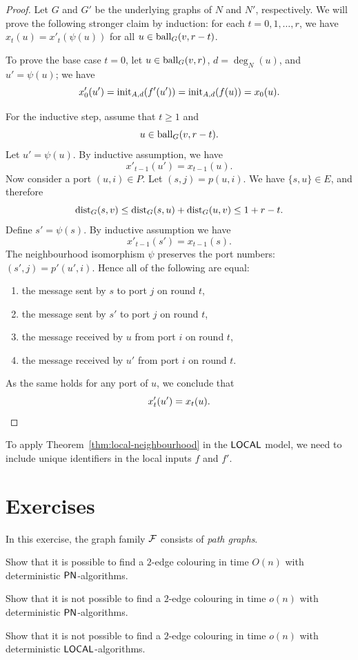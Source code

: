 \begin{proof}
    Let $G$ and $G'$ be the underlying graphs of $N$ and $N'$, respectively. We will prove the following stronger claim by induction: for each $t = 0, 1, \dotsc, r$, we have $x_t(u) = x'_t(\psi(u))$ for all $u \in \operatorname{ball}_G(v,r-t)$.
    
    To prove the base case $t = 0$, let $u \in \operatorname{ball}_G(v,r)$, $d = \deg_N(u)$, and $u' = \psi(u)$; we have
    \[
        x'_0(u') = \operatorname{init}_{A,d}(f'(u')) = \operatorname{init}_{A,d}(f(u)) = x_0(u).
    \]
    
    For the inductive step, assume that $t \ge 1$ and \[u \in \operatorname{ball}_G(v,r-t).\] Let $u' = \psi(u)$. By inductive assumption, we have
    \[
        x'_{t-1}(u') = x_{t-1}(u).
    \]
    Now consider a port $(u,i) \in P$. Let $(s,j) = p(u,i)$. We have $\{s,u\} \in E$, and therefore
    \[
        \operatorname{dist}_G(s,v) \le \operatorname{dist}_G(s,u) + \operatorname{dist}_G(u,v) \le 1 + r-t.
    \]
    Define $s' = \psi(s)$. By inductive assumption we have
    \[
        x'_{t-1}(s') = x_{t-1}(s).
    \]
    The neighbourhood isomorphism $\psi$ preserves the port numbers: $(s',j) = p'(u',i)$. Hence all of the following are equal:
    \begin{enumerate}[noitemsep]
        \item the message sent by $s$ to port $j$ on round $t$,
        \item the message sent by $s'$ to port $j$ on round $t$,
        \item the message received by $u$ from port $i$ on round $t$,
        \item the message received by $u'$ from port $i$ on round $t$.
    \end{enumerate}
    As the same holds for any port of $u$, we conclude that
    \[
        x'_t(u') = x_t(u). \qedhere
    \]
\end{proof}

To apply Theorem~\ref{thm:local-neighbourhood} in the $\textup{\sffamily LOCAL}$ model, we need to include unique identifiers in the local inputs $f$ and $f'$.


\section{Exercises}

\begin{ex}
    In this exercise, the graph family $\mathcal{F}$ consists of \emph{path graphs}.
    \begin{subex}
        \item Show that it is possible to find a $2$-edge colouring in time $O(n)$ with deterministic $\textup{\sffamily PN}$-algorithms.
        \item Show that it is not possible to find a $2$-edge colouring in time $o(n)$ with deterministic $\textup{\sffamily PN}$-algorithms.
        \item Show that it is not possible to find a $2$-edge colouring in time $o(n)$ with deterministic $\textup{\sffamily LOCAL}$-algorithms.
    \end{subex}
\end{ex}

